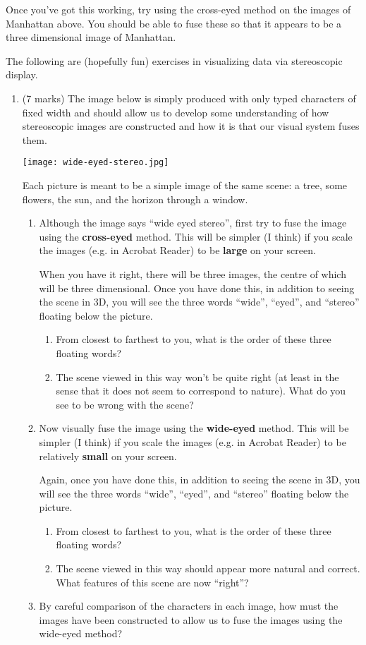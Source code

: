 \documentclass[12]{article}
\begin{document}
\begin{enumerate}
Once you've got this working, try using the cross-eyed method on the images of Manhattan above.  You should be able to fuse these so that it appears to be a three dimensional image of Manhattan.

The following are (hopefully fun) exercises in visualizing data via stereoscopic display.

\begin{enumerate}
\item (7 marks) The image below is simply produced with only typed characters of fixed width and should allow us to develop some understanding of how stereoscopic images are constructed and how it is that our visual system fuses them.
\begin{center}
\texttt{[image: wide-eyed-stereo.jpg]} 
\end{center}
Each picture is meant to be a simple image of the same scene:  a tree, some flowers, the sun, and the
horizon through a window. 
\begin{enumerate}
\item Although the image says ``wide eyed stereo'', first try to fuse the image using the {\bf cross-eyed} method.  This will be simpler (I think) if you scale the images (e.g. in Acrobat Reader) to be {\bf large} on your screen.  

When you have it right, there will be three images, the centre of which will be three dimensional.  Once you have done this, in addition to seeing the scene in 3D, you will see the three words ``wide'', ``eyed'', and ``stereo'' floating below the picture. 
\begin{enumerate}
\item From closest to farthest to you, what is the order of these three floating words?
\item The scene viewed in this way won't be quite right (at least in the sense that it does not seem to correspond to nature).
What do you see to be wrong with the scene?
\end{enumerate}

\item Now visually fuse the image using the {\bf wide-eyed} method.  This will be simpler (I think) if you scale the images (e.g. in Acrobat Reader) to be relatively {\bf small} on your screen.  

Again, once you have done this, in addition to seeing the scene in 3D, you will see the three words ``wide'', ``eyed'', and ``stereo'' floating below the picture.
\begin{enumerate}
\item From closest to farthest to you, what is the order of these three floating words?
\item The scene viewed in this way should appear more natural and correct.  What features of this scene are now ``right''?
\end{enumerate}
\item By careful comparison of the characters in each image, how must the images have been constructed to allow us to fuse the images using the wide-eyed method?


\end{enumerate}
\end{enumerate}
\end{enumerate}
\end{document}

